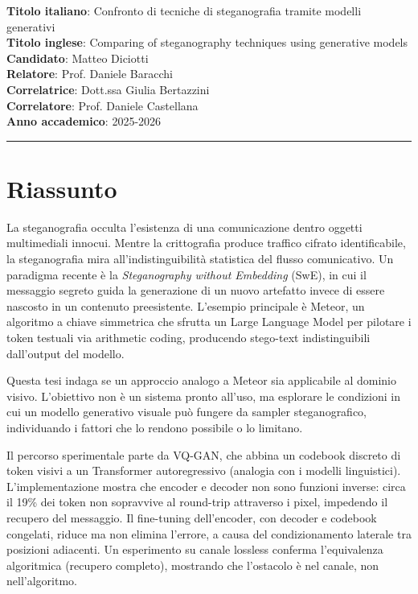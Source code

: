 \documentclass[a4paper, 11pt]{article}
\begin{document}
\pagestyle{empty}
\noindent
\textbf{Titolo italiano}: Confronto di tecniche di steganografia tramite modelli generativi\\
\textbf{Titolo inglese}: Comparing of steganography techniques using generative models\\
\textbf{Candidato}: Matteo Diciotti\\
\textbf{Relatore}: Prof. Daniele Baracchi\\
\textbf{Correlatrice}: Dott.ssa Giulia Bertazzini\\
\textbf{Correlatore}: Prof. Daniele Castellana\\
\textbf{Anno accademico}: 2025-2026\\
\vspace{1ex}
\hrule

\section*{Riassunto}
La steganografia occulta l'esistenza di una comunicazione dentro oggetti multimediali innocui. Mentre la crittografia produce traffico cifrato identificabile, la steganografia mira all'indistinguibilità statistica del flusso comunicativo. Un paradigma recente è la \emph{Steganography without Embedding} (SwE), in cui il messaggio segreto guida la generazione di un nuovo artefatto invece di essere nascosto in un contenuto preesistente. L'esempio principale è Meteor, un algoritmo a chiave simmetrica che sfrutta un Large Language Model per pilotare i token testuali via arithmetic coding, producendo stego-text indistinguibili dall'output del modello.

Questa tesi indaga se un approccio analogo a Meteor sia applicabile al dominio visivo. L'obiettivo non è un sistema pronto all'uso, ma esplorare le condizioni in cui un modello generativo visuale può fungere da sampler steganografico, individuando i fattori che lo rendono possibile o lo limitano.

Il percorso sperimentale parte da VQ-GAN, che abbina un codebook discreto di token visivi a un Transformer autoregressivo (analogia con i modelli linguistici). L'implementazione mostra che encoder e decoder non sono funzioni inverse: circa il 19\% dei token non sopravvive al round-trip attraverso i pixel, impedendo il recupero del messaggio. Il fine-tuning dell'encoder, con decoder e codebook congelati, riduce ma non elimina l'errore, a causa del condizionamento laterale tra posizioni adiacenti. Un esperimento su canale lossless conferma l'equivalenza algoritmica (recupero completo), mostrando che l'ostacolo è nel canale, non nell'algoritmo.
\end{document}
